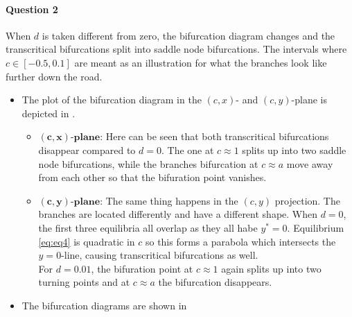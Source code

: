 \documentclass[a4paper,11pt]{article}
\begin{document}
\paragraph{Question 2}\; When $d$ is taken different from zero, the bifurcation diagram changes and the transcritical bifurcations split into saddle node bifurcations.
The intervals where $c\in[-0.5, 0.1]$ are meant as an illustration for what the branches look like further down the road.\\
\begin{itemize}
	\item[\boxed{\mathbf{d=0.01}}  ] The plot of the bifurcation diagram in the $(c,x)$- and $(c,y)$-plane is depicted in .
	\begin{itemize}
		\item $\mathbf{(c,x)\text{-plane}}$:  Here can be seen that both transcritical bifurcations disappear compared to $d=0$. The one at $c\approx1$ splits up into two saddle node 
		bifurcations, while the branches bifurcation at $c\approx a$ move away from each other so that the bifuration point vanishes.
		\item $\mathbf{(c,y)\text{-plane}}$:  The same thing happens in the $(c,y)$ projection. The branches are located differently and have a different shape.
		When $d=0$, the first three equilibria all overlap as they all habe $y^*=0$. Equilibrium \eqref{eq:eq4} is quadratic in $c$ so this forms a parabola which intersects the
		$y=0$-line, causing transcritical bifurcations as well.\\
		For $d=0.01$, the bifuration point at $c\approx1$ again splits up into two turning points and at $c\approx a$ the bifurcation disappears.
	\end{itemize}
	\item[\boxed{\mathbf{d=-0.01}}  ] The bifurcation diagrams are shown in 
\end{itemize}
\end{document}
